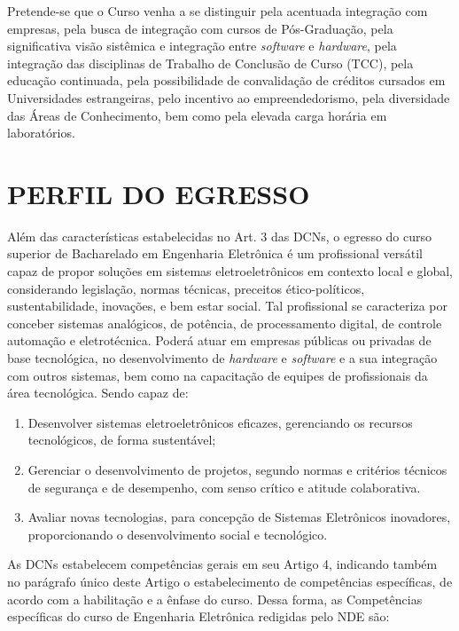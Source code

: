 Pretende-se que o Curso venha a se distinguir pela acentuada integração com empresas, pela busca de integração com cursos de Pós-Graduação, pela significativa visão sistêmica e integração entre \textit{software} e \textit{hardware}, pela integração das disciplinas de Trabalho de Conclusão de Curso (TCC), pela educação continuada, pela possibilidade de convalidação de créditos cursados em Universidades estrangeiras, pelo incentivo ao empreendedorismo, pela diversidade das Áreas de Conhecimento, bem como pela elevada carga horária em laboratórios.

\section{PERFIL DO EGRESSO}
\label{sec:perf}

Além das características estabelecidas no Art. 3\textordmasculine{} das DCNs, o egresso do curso superior de Bacharelado em Engenharia Eletrônica é um profissional versátil capaz de propor soluções em sistemas eletroeletrônicos em contexto local e global, considerando legislação, normas técnicas, preceitos ético-políticos, sustentabilidade, inovações, e bem estar social. Tal profissional se caracteriza por conceber sistemas analógicos, de potência, de processamento digital, de controle automação e eletrotécnica. Poderá atuar em empresas públicas ou privadas de base tecnológica, no desenvolvimento de \textit{hardware} e \textit{software} e a sua integração com outros sistemas, bem como na capacitação de equipes de profissionais da área tecnológica. Sendo capaz de:


\renewcommand{\labelenumi}{\roman{enumi}}
\begin{enumerate}
	\item Desenvolver sistemas eletroeletrônicos eficazes, gerenciando os recursos tecnológicos, de forma sustentável; 
	\item Gerenciar o desenvolvimento de projetos, segundo normas e critérios técnicos de segurança e de desempenho, com senso crítico e atitude colaborativa. 
	\item Avaliar novas tecnologias, para concepção de Sistemas Eletrônicos inovadores, proporcionando o desenvolvimento social e tecnológico.
\end{enumerate} 

As DCNs \cite{dcneng} estabelecem competências gerais em seu Artigo 4\textordmasculine, indicando também no parágrafo único deste Artigo o estabelecimento de competências específicas, de acordo com a habilitação e a ênfase do curso. Dessa forma, as Competências específicas do curso de Engenharia Eletrônica redigidas pelo NDE são:

